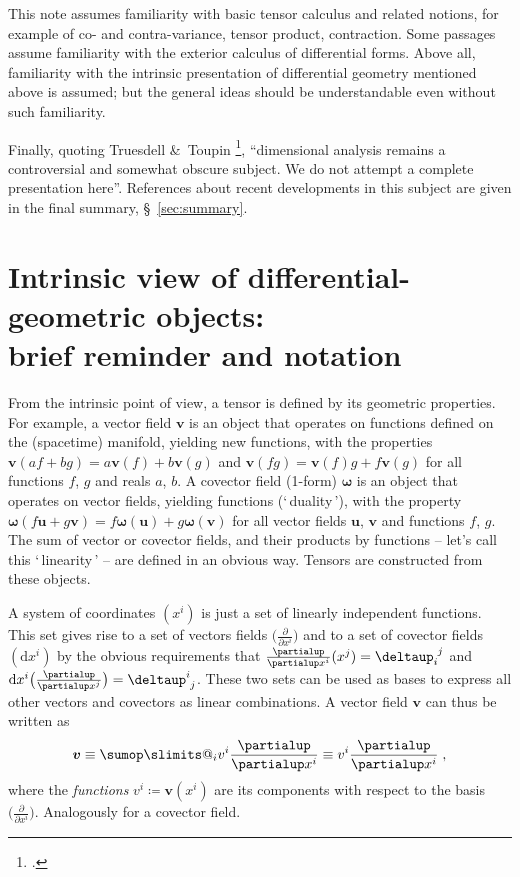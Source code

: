 \documentclass[\ifafour a4paper,12pt,\else a5paper,10pt,\fi%
onecolumn,oneside,article,%
british%
]{memoir}
\makeatletter
\newcommand*{\defquote}[1]{`\,#1\,'}
\theoremstyle{remark}
\theoremstyle{innote}
\def\sum{\DOTSI\sumop\slimits@}
\newcommand*{\citep}{\footcites}
\newcommand*{\amp}{\&}
\newcommand*{\de}{\partialup}%
\newcommand*{\delt}{\deltaup}%
\newcommand*{\di}{\mathrm{d}}%
\newcommand*{\defd}{\coloneqq}
\newcommand*{\dotv}{\mathord{\,\cdot\,}}%
\renewcommand*{\|}[1][]{\nonscript\,#1\vert\nonscript\;\mathopen{}}
\newcommand*{\sect}{\S}%
\newcommand*{\yom}{\bm{\omega}}
\newcommand*{\yv}{\bm{v}}
\newcommand*{\yu}{\bm{u}}
\renewcommand*{\i}{\indices}
\newcommand*{\dex}[1][i]{\frac{\de}{\de x^{#1}}}
\newcommand*{\dix}[1][i]{\di x^{#1}}
\makeatother
\begin{document}

\medskip

This note assumes familiarity with basic tensor calculus and related
notions, for example of co- and contra-variance, tensor product,
contraction. Some passages assume familiarity with the exterior calculus of
differential forms. Above all, familiarity with the intrinsic presentation
of differential geometry mentioned above is assumed; but the general ideas
should be understandable even without such familiarity.

Finally, quoting Truesdell \amp\ Toupin \citep[Appendix \sect~7
footnote~4]{truesdelletal1960}, \enquote{dimensional analysis remains a
  controversial and somewhat obscure subject. We do not attempt a complete
  presentation here}.  References about recent developments in this
subject are given in the final summary, \sect~\ref{sec:summary}.




\section{Intrinsic view of differential-geometric objects:\\ brief
  reminder and notation}
\label{sec:remined}


From the intrinsic point of view, a tensor is defined by its geometric
properties. For example, a vector field $\yv$ %
is an object that operates on functions defined on the (spacetime)
manifold, yielding new functions, with the properties
$\yv(af+bg)=a\yv(f)+b\yv(g)$ and $\yv(fg)=\yv(f)g+f\yv(g)$ for all
functions $f$, $g$ and reals $a$, $b$. A covector field (1-form) $\yom$ is
an object that operates on vector fields, yielding functions
(\defquote{duality}), with the property
$\yom(f\yu+g\yv)=f\yom(\yu)+g\yom(\yv)$ for all vector fields $\yu$, $\yv$
and functions $f$, $g$. The sum of vector or covector fields, and their
products by functions -- let's call this \defquote{linearity} -- are
defined in an obvious way. Tensors are constructed from these objects.

A system of coordinates $(x^{i})$ is just a set of linearly independent
functions. This set gives rise to a set of vectors fields
$\bigl(\dex\bigr)$ and to a set of covector fields $(\dix)$ by the obvious
requirements that $\dex(x^{j})=\delt\i{_{i}^{j}}$ and
$\dix\bigl(\dex[j]\bigr)=\delt\i{^{i}_{j}}$. These two sets can be used as bases
to express all other vectors and covectors as linear combinations. A
vector field $\yv$ can thus be written as
\begin{equation}
  \label{eq:vector_intrinsic}
  \yv \equiv \sum_{i}v^{i}\dex \equiv v^{i}\dex \;,
\end{equation}
where the \emph{functions} $v^{i}\defd \yv(x^{i})$ are its components with
respect to the basis $\bigl(\dex\bigr)$. Analogously for a covector field.
\end{document}

